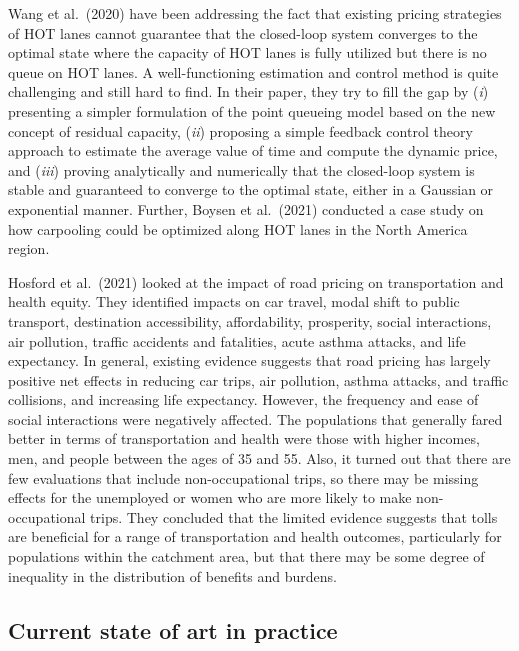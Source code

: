 \documentclass[
]{book}
\begin{document}
Wang et al.~(2020) have been addressing the fact that existing pricing strategies of HOT lanes cannot guarantee that the closed-loop system converges to the optimal state where the capacity of HOT lanes is fully utilized but there is no queue on HOT lanes. A well-functioning estimation and control method is quite challenging and still hard to find. In their paper, they try to fill the gap by (\emph{i}) presenting a simpler formulation of the point queueing model based on the new concept of residual capacity, (\emph{ii}) proposing a simple feedback control theory approach to estimate the average value of time and compute the dynamic price, and (\emph{iii}) proving analytically and numerically that the closed-loop system is stable and guaranteed to converge to the optimal state, either in a Gaussian or exponential manner. Further, Boysen et al.~(2021) conducted a case study on how carpooling could be optimized along HOT lanes in the North America region.

Hosford et al.~(2021) looked at the impact of road pricing on transportation and health equity. They identified impacts on car travel, modal shift to public transport, destination accessibility, affordability, prosperity, social interactions, air pollution, traffic accidents and fatalities, acute asthma attacks, and life expectancy. In general, existing evidence suggests that road pricing has largely positive net effects in reducing car trips, air pollution, asthma attacks, and traffic collisions, and increasing life expectancy. However, the frequency and ease of social interactions were negatively affected. The populations that generally fared better in terms of transportation and health were those with higher incomes, men, and people between the ages of 35 and 55. Also, it turned out that there are few evaluations that include non-occupational trips, so there may be missing effects for the unemployed or women who are more likely to make non-occupational trips. They concluded that the limited evidence suggests that tolls are beneficial for a range of transportation and health outcomes, particularly for populations within the catchment area, but that there may be some degree of inequality in the distribution of benefits and burdens.

\hypertarget{current-state-of-art-in-practice-3}{%
\subsection*{Current state of art in practice}\label{current-state-of-art-in-practice-3}}
\end{document}
